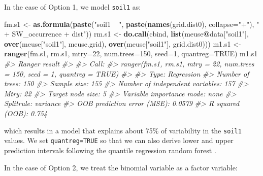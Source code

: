 \documentclass[graybox,natbib,nospthms,UStrade]{svmono}
\newenvironment{Shaded}{\begin{snugshade}}{\end{snugshade}}
\newcommand{\CommentTok}[1]{\textcolor[rgb]{0.37,0.37,0.37}{\textit{#1}}}
\newcommand{\DataTypeTok}[1]{\textcolor[rgb]{0.27,0.27,0.27}{#1}}
\newcommand{\DecValTok}[1]{\textcolor[rgb]{0.06,0.06,0.06}{#1}}
\newcommand{\KeywordTok}[1]{\textcolor[rgb]{0.27,0.27,0.27}{\textbf{#1}}}
\newcommand{\NormalTok}[1]{#1}
\newcommand{\OperatorTok}[1]{\textcolor[rgb]{0.43,0.43,0.43}{\textbf{#1}}}
\newcommand{\OtherTok}[1]{\textcolor[rgb]{0.37,0.37,0.37}{#1}}
\newcommand{\StringTok}[1]{\textcolor[rgb]{0.5,0.5,0.5}{#1}}
\begin{document}
In the case of Option 1, we model \texttt{soil1} as:

\begin{Shaded}
\begin{Highlighting}[]
\NormalTok{fm.s1 <-}\StringTok{ }\KeywordTok{as.formula}\NormalTok{(}\KeywordTok{paste}\NormalTok{(}\StringTok{"soil1 ~ "}\NormalTok{, }\KeywordTok{paste}\NormalTok{(}\KeywordTok{names}\NormalTok{(grid.dist0), }\DataTypeTok{collapse=}\StringTok{"+"}\NormalTok{), }
                         \StringTok{" + SW_occurrence + dist"}\NormalTok{))}
\NormalTok{rm.s1 <-}\StringTok{ }\KeywordTok{do.call}\NormalTok{(cbind, }\KeywordTok{list}\NormalTok{(meuse}\OperatorTok{@}\NormalTok{data[}\StringTok{"soil1"}\NormalTok{], }
                             \KeywordTok{over}\NormalTok{(meuse[}\StringTok{"soil1"}\NormalTok{], meuse.grid), }
                             \KeywordTok{over}\NormalTok{(meuse[}\StringTok{"soil1"}\NormalTok{], grid.dist0)))}
\NormalTok{m1.s1 <-}\StringTok{ }\KeywordTok{ranger}\NormalTok{(fm.s1, rm.s1, }\DataTypeTok{mtry=}\DecValTok{22}\NormalTok{, }\DataTypeTok{num.trees=}\DecValTok{150}\NormalTok{, }\DataTypeTok{seed=}\DecValTok{1}\NormalTok{, }\DataTypeTok{quantreg=}\OtherTok{TRUE}\NormalTok{)}
\NormalTok{m1.s1}
\CommentTok{#> Ranger result}
\CommentTok{#> }
\CommentTok{#> Call:}
\CommentTok{#>  ranger(fm.s1, rm.s1, mtry = 22, num.trees = 150, seed = 1, quantreg = TRUE) }
\CommentTok{#> }
\CommentTok{#> Type:                             Regression }
\CommentTok{#> Number of trees:                  150 }
\CommentTok{#> Sample size:                      155 }
\CommentTok{#> Number of independent variables:  157 }
\CommentTok{#> Mtry:                             22 }
\CommentTok{#> Target node size:                 5 }
\CommentTok{#> Variable importance mode:         none }
\CommentTok{#> Splitrule:                        variance }
\CommentTok{#> OOB prediction error (MSE):       0.0579 }
\CommentTok{#> R squared (OOB):                  0.754}
\end{Highlighting}
\end{Shaded}

which results in a model that explains about 75\% of variability in the \texttt{soil1} values.
We set \texttt{quantreg=TRUE} so that we can also derive lower and upper prediction
intervals following the quantile regression random forest \citep{meinshausen2006quantile}.

In the case of Option 2, we treat the binomial variable as a factor variable:
\end{document}
